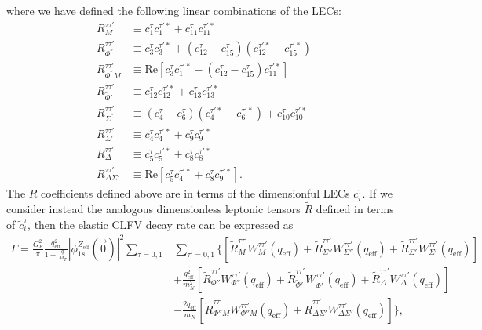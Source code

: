 \documentclass[12pt,letterpaper]{book}
\begin{document}
where we have defined the following linear combinations of the LECs:
\begin{equation}
\begin{split}
R_M^{\tau\tau'}&\equiv c_1^{\tau}c_1^{\tau'*}+c_{11}^{\tau}c_{11}^{\tau'*}\\
R_{\Phi^{''}}^{\tau\tau'}&\equiv c_3^{\tau}c_3^{\tau'*}+\left(c^{\tau}_{12}-c_{15}^{\tau}\right)\left(c_{12}^{\tau'*}-c_{15}^{\tau'*}\right)\\
R^{\tau\tau'}_{\Phi^{''}M}&\equiv \mathrm{Re}\left[c_3^{\tau}c_1^{\tau'*}-(c_{12}^{\tau}-c_{15}^{\tau})c_{11}^{\tau'*}\right]\\
R_{\tilde{\Phi}'}^{\tau\tau'}&\equiv c_{12}^{\tau}c_{12}^{\tau'*}+c_{13}^{\tau}c_{13}^{\tau'*}\\
R_{\Sigma^{''}}^{\tau\tau'}&\equiv (c_4^{\tau}-c_6^{\tau})(c_4^{\tau'*}-c_6^{\tau'*})+c_{10}^{\tau}c_{10}^{\tau'*}\\
R_{\Sigma'}^{\tau\tau'}&\equiv c_4^{\tau}c_4^{\tau'*}+c_9^{\tau}c_9^{\tau'*}\\
R_{\Delta}^{\tau\tau'}&\equiv c_5^{\tau}c_5^{\tau'*}+c_8^{\tau}c_8^{\tau'*}\\
R_{\Delta\Sigma'}^{\tau\tau'}&\equiv \mathrm{Re}\left[c_5^{\tau}c_4^{\tau'*}+c_8^{\tau}c_9^{\tau'*}\right].
\end{split}
\end{equation}
The $R$ coefficients defined above are in terms of the dimensionful LECs $c_i^{\tau}$. If we consider instead the analogous dimensionless leptonic tensors $\tilde{R}$ defined in terms of $\tilde{c}_i^{\tau}$, then the elastic CLFV decay rate can be expressed as 
\begin{equation}
\begin{split}
\Gamma=\frac{G_F^2}{\pi}\frac{q_\mathrm{eff}^2}{1+\frac{q}{M_T}}|\phi_{1s}^{Z_\mathrm{eff}}(\vec{0})|^2\sum_{\tau=0,1}&\sum_{\tau'=0,1}\Bigg\{\left[\tilde{R}_M^{\tau\tau'}W_M^{\tau\tau'}(q_\mathrm{eff})+\tilde{R}_{\Sigma''}^{\tau\tau'}W_{\Sigma''}^{\tau\tau'}(q_\mathrm{eff})+\tilde{R}_{\Sigma'}^{\tau\tau'}W_{\Sigma'}^{\tau\tau'}(q_\mathrm{eff})\right]\\
&+\frac{q_\mathrm{eff}^2}{m_N^2}\left[\tilde{R}_{\Phi''}^{\tau\tau'}W_{\Phi''}^{\tau\tau'}(q_\mathrm{eff})+\tilde{R}_{\tilde{\Phi}'}^{\tau\tau'}W_{\tilde{\Phi}'}^{\tau\tau'}(q_\mathrm{eff})+\tilde{R}_{\Delta}^{\tau\tau'}W_{\Delta}^{\tau\tau'}(q_\mathrm{eff})\right]\\
&-\frac{2q_\mathrm{eff}}{m_N}\left[\tilde{R}_{\Phi'' M}^{\tau\tau'}W_{\Phi'' M}^{\tau\tau'}(q_\mathrm{eff})+\tilde{R}_{\Delta\Sigma'}^{\tau\tau'}W_{\Delta\Sigma'}^{\tau\tau'}(q_\mathrm{eff})\right]\Bigg\},
\end{split}
\label{eq:mu2e_rate}
\end{equation}
\end{document}
